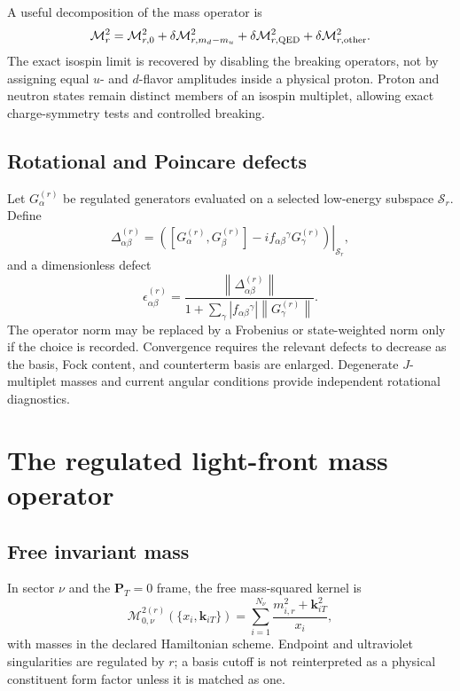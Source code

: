 \documentclass[11pt]{article}
\newcommand{\PT}{\bm{P}_{T}}
\newcommand{\cM}{\mathcal M}
\newcommand{\cS}{\mathcal S}
\newcommand{\abs}[1]{\left|#1\right|}
\newcommand{\norm}[1]{\left\lVert#1\right\rVert}
\begin{document}
A useful decomposition of the mass operator is
\begin{equation}
 \cM_r^2
 =\cM_{r,0}^2
 +\delta\cM_{r,m_d-m_u}^2
 +\delta\cM_{r,\rm QED}^2
 +\delta\cM_{r,\rm other}^2.
\label{eq:isospin-breaking-mass}
\end{equation}
The exact isospin limit is recovered by disabling the breaking operators, not
by assigning equal \(u\)- and \(d\)-flavor amplitudes inside a physical
proton.  Proton and neutron states remain distinct members of an isospin
multiplet, allowing exact charge-symmetry tests and controlled breaking.

\subsection{Rotational and Poincare defects}

Let \(G_\alpha^{(r)}\) be regulated generators evaluated on a selected
low-energy subspace \(\cS_r\).  Define
\begin{equation}
 \Delta_{\alpha\beta}^{(r)}
 =\left.
 \left(
 [G_\alpha^{(r)},G_\beta^{(r)}]
 -i f_{\alpha\beta}{}^\gamma G_\gamma^{(r)}
 \right)\right|_{\cS_r},
\label{eq:poincare-defect-operator}
\end{equation}
and a dimensionless defect
\begin{equation}
 \epsilon_{\alpha\beta}^{(r)}
 =\frac{\norm{\Delta_{\alpha\beta}^{(r)}}}
 {1+\sum_\gamma\abs{f_{\alpha\beta}{}^\gamma}
 \norm{G_\gamma^{(r)}}}.
\label{eq:poincare-defect}
\end{equation}
The operator norm may be replaced by a Frobenius or state-weighted norm only
if the choice is recorded.  Convergence requires the relevant defects to
decrease as the basis, Fock content, and counterterm basis are enlarged.
Degenerate \(J\)-multiplet masses and current angular conditions provide
independent rotational diagnostics.

\section{The regulated light-front mass operator}
\label{sec:mass-operator}

\subsection{Free invariant mass}

In sector \(\nu\) and the \(\PT=0\) frame, the free mass-squared kernel is
\begin{equation}
 \cM_{0,\nu}^{2(r)}
 (\{x_i,\bm k_{iT}\})
 =\sum_{i=1}^{N_\nu}
 \frac{m_{i,r}^2+\bm k_{iT}^2}{x_i},
\label{eq:free-invariant-mass}
\end{equation}
with masses in the declared Hamiltonian scheme.  Endpoint and ultraviolet
singularities are regulated by \(r\); a basis cutoff is not reinterpreted as
a physical constituent form factor unless it is matched as one.
\end{document}

